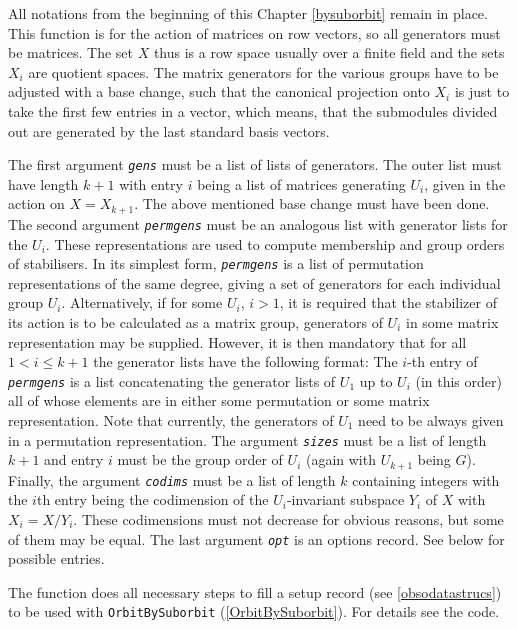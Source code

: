 \documentclass[a4paper,11pt]{report}
\begin{document}
{{{ All notations from the beginning of this Chapter \ref{bysuborbit} remain in place. This function is for the action of matrices on row vectors,
so all generators must be matrices. The set $X$ thus is a row space usually over a finite field and the sets $X_i$ are quotient spaces. The matrix generators for the various groups have to be
adjusted with a base change, such that the canonical projection onto $X_i$ is just to take the first few entries in a vector, which means, that the
submodules divided out are generated by the last standard basis vectors. 

 The first argument \mbox{\texttt{\mdseries\slshape gens}} must be a list of lists of generators. The outer list must have length $k+1$ with entry $i$ being a list of matrices generating $U_i$, given in the action on $X=X_{{k+1}}$. The above mentioned base change must have been done. The second argument \mbox{\texttt{\mdseries\slshape permgens}} must be an analogous list with generator lists for the $U_i$. These representations are used to compute membership and group orders of
stabilisers. In its simplest form, \mbox{\texttt{\mdseries\slshape permgens}} is a list of permutation representations of the same degree, giving a set of
generators for each individual group $U_i$. Alternatively, if for some $U_i$, $i > 1$, it is required that the stabilizer of its action is to be calculated as a
matrix group, generators of $U_i$ in some matrix representation may be supplied. However, it is then mandatory
that for all $1 < i \leq k+1$ the generator lists have the following format: The $i$-th entry of \mbox{\texttt{\mdseries\slshape permgens}} is a list concatenating the generator lists of $U_1$ up to $U_i$ (in this order) all of whose elements are in either some permutation or some
matrix representation. Note that currently, the generators of $U_1$ need to be always given in a permutation representation. The argument \mbox{\texttt{\mdseries\slshape sizes}} must be a list of length $k+1$ and entry $i$ must be the group order of $U_i$ (again with $U_{{k+1}}$ being $G$). Finally, the argument \mbox{\texttt{\mdseries\slshape codims}} must be a list of length $k$ containing integers with the $i$th entry being the codimension of the $U_i$-invariant subspace $Y_i$ of $X$ with $X_i = X/Y_i$. These codimensions must not decrease for obvious reasons, but some of them
may be equal. The last argument \mbox{\texttt{\mdseries\slshape opt}} is an options record. See below for possible entries. 

 The function does all necessary steps to fill a setup record (see \ref{obsodatastrucs}) to be used with \texttt{OrbitBySuborbit} (\ref{OrbitBySuborbit}). For details see the code. 

}}}
\end{document}
